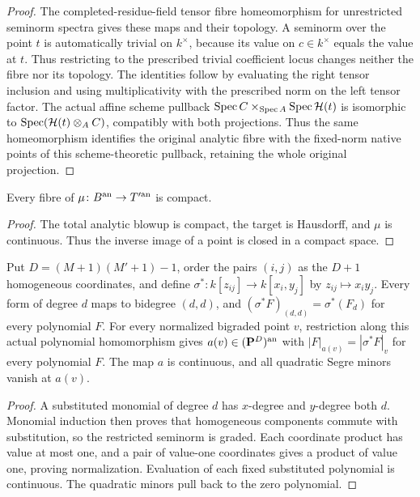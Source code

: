 \begin{proof}
The completed-residue-field tensor fibre homeomorphism for unrestricted seminorm spectra gives these maps and
their topology. A seminorm over the point $t$ is automatically trivial on $k^\times$, because its value on
$c\in k^\times$ equals the value at $t$. Thus restricting to the prescribed trivial coefficient locus changes
neither the fibre nor its topology. The identities follow by evaluating the right tensor inclusion and using
multiplicativity with the prescribed norm on the left tensor factor. The actual affine scheme pullback
$\operatorname{Spec} C\times_{\operatorname{Spec} A}\operatorname{Spec}\mathcal H(t)$ is isomorphic to $\operatorname{Spec}(\mathcal H(t)\otimes_AC)$,
compatibly with both projections. Thus the same homeomorphism identifies the original analytic fibre with the
fixed-norm native points of this scheme-theoretic pullback, retaining the whole original projection.
\end{proof}

\begin{lemma}\label{lem:fc-fibre-compact}
\leanok
{}
Every fibre of $\mu\colon B^{\mathrm{an}}\to T'^{\mathrm{an}}$ is compact.
\end{lemma}

\begin{proof}
The total analytic blowup is compact, the target is Hausdorff, and $\mu$ is continuous. Thus the inverse image of
a point is closed in a compact space.
\end{proof}

\begin{lemma}\label{lem:fc-segre-polynomials}

Put $D=(M+1)(M'+1)-1$, order the pairs $(i,j)$ as the $D+1$ homogeneous coordinates, and define
$\sigma^*\colon k[z_{ij}]\to k[x_i,y_j]$ by $z_{ij}\mapsto x_i y_j$.
Every form of degree $d$ maps to bidegree $(d,d)$, and
$(\sigma^*F)_{(d,d)}=\sigma^*(F_d)$ for every polynomial $F$.
For every normalized bigraded point $v$, restriction along this actual polynomial homomorphism gives
$a(v)\in(\mathbf{P}^D)^{\mathrm{an}}$ with $|F|_{a(v)}=|\sigma^*F|_v$ for every polynomial $F$.
The map $a$ is continuous, and all quadratic Segre minors vanish at $a(v)$.
\end{lemma}

\begin{proof}
A substituted monomial of degree $d$ has $x$-degree and $y$-degree both $d$.
Monomial induction then proves that homogeneous components commute with substitution, so the restricted
seminorm is graded. Each coordinate product has value at most one, and a pair of value-one coordinates gives
a product of value one, proving normalization. Evaluation of each fixed substituted polynomial is continuous.
The quadratic minors pull back to the zero polynomial.
\end{proof}

